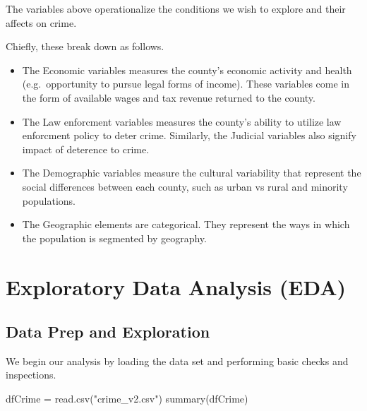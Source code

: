 \documentclass[]{article}
\newenvironment{Shaded}{}{}
\newcommand{\KeywordTok}[1]{\textcolor[rgb]{0.00,0.00,1.00}{#1}}
\newcommand{\NormalTok}[1]{#1}
\newcommand{\StringTok}[1]{\textcolor[rgb]{0.00,0.50,0.50}{#1}}
\begin{document}
The variables above operationalize the conditions we wish to explore and
their affects on crime.

Chiefly, these break down as follows.

\begin{itemize}
\item
  The Economic variables measures the county's economic activity and
  health (e.g.~opportunity to pursue legal forms of income). These
  variables come in the form of available wages and tax revenue returned
  to the county.
\item
  The Law enforcment variables measures the county's ability to utilize
  law enforcment policy to deter crime. Similarly, the Judicial
  variables also signify impact of deterence to crime.
\item
  The Demographic variables measure the cultural variability that
  represent the social differences between each county, such as urban vs
  rural and minority populations.
\item
  The Geographic elements are categorical. They represent the ways in
  which the population is segmented by geography.
\end{itemize}

\hypertarget{exploratory-data-analysis-eda}{%
\section{Exploratory Data Analysis
(EDA)}\label{exploratory-data-analysis-eda}}

\hypertarget{data-prep-and-exploration}{%
\subsection{Data Prep and Exploration}\label{data-prep-and-exploration}}

We begin our analysis by loading the data set and performing basic
checks and inspections.

\begin{Shaded}
\begin{Highlighting}[]
\NormalTok{dfCrime =}\StringTok{ }\KeywordTok{read.csv}\NormalTok{(}\StringTok{"crime_v2.csv"}\NormalTok{)}
\KeywordTok{summary}\NormalTok{(dfCrime)}
\end{Highlighting}
\end{Shaded}
\end{document}
